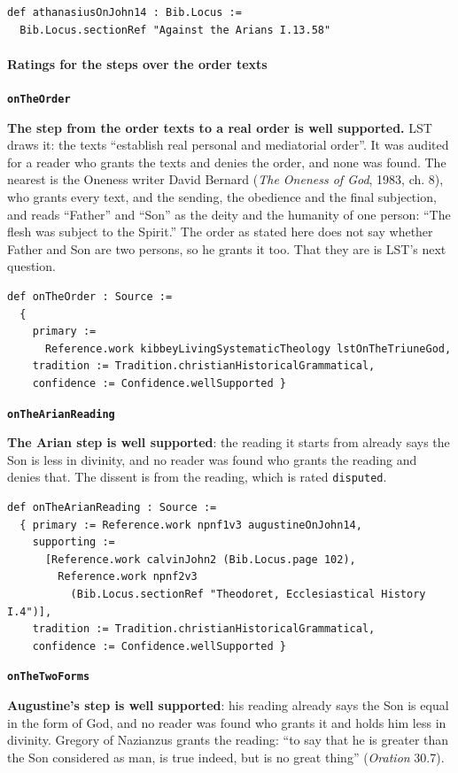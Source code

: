 \documentclass[11pt,paper=\testimonypaper,DIV=13,parskip=false]{scrartcl}
\begin{document}
{\small\begin{verbatim}
def athanasiusOnJohn14 : Bib.Locus :=
  Bib.Locus.sectionRef "Against the Arians I.13.58"
\end{verbatim}}
\paragraph*{Ratings for the steps over the order texts}
\leavevmode\par\nobreak
\par\medskip\noindent\textbf{\texttt{on\allowbreak{}The\allowbreak{}Order}}\par\nobreak\noindent
\textbf{The step from the order texts to a real order is well supported.} LST draws it: the texts “establish real personal and mediatorial order”. It was audited for a reader who grants the texts and denies the order, and none was found. The nearest is the Oneness writer David Bernard (\emph{The Oneness of God}, 1983, ch. 8), who grants every text, and the sending, the obedience and the final subjection, and reads “Father” and “Son” as the deity and the humanity of one person: “The flesh was subject to the Spirit.” The order as stated here does not say whether Father and Son are two persons, so he grants it too. That they are is LST’s next question.

{\small\begin{verbatim}
def onTheOrder : Source :=
  {
    primary :=
      Reference.work kibbeyLivingSystematicTheology lstOnTheTriuneGod,
    tradition := Tradition.christianHistoricalGrammatical,
    confidence := Confidence.wellSupported }
\end{verbatim}}
\par\medskip\noindent\textbf{\texttt{on\allowbreak{}The\allowbreak{}Arian\allowbreak{}Reading}}\par\nobreak\noindent
\textbf{The Arian step is well supported}: the reading it starts from already says the Son is less in divinity, and no reader was found who grants the reading and denies that. The dissent is from the reading, which is rated \texttt{disputed}.

{\small\begin{verbatim}
def onTheArianReading : Source :=
  { primary := Reference.work npnf1v3 augustineOnJohn14,
    supporting :=
      [Reference.work calvinJohn2 (Bib.Locus.page 102),
        Reference.work npnf2v3
          (Bib.Locus.sectionRef "Theodoret, Ecclesiastical History I.4")],
    tradition := Tradition.christianHistoricalGrammatical,
    confidence := Confidence.wellSupported }
\end{verbatim}}
\par\medskip\noindent\textbf{\texttt{on\allowbreak{}The\allowbreak{}Two\allowbreak{}Forms}}\par\nobreak\noindent
\textbf{Augustine’s step is well supported}: his reading already says the Son is equal in the form of God, and no reader was found who grants it and holds him less in divinity. Gregory of Nazianzus grants the reading: “to say that he is greater than the Son considered as man, is true indeed, but is no great thing” (\emph{Oration} 30.7).
\end{document}
